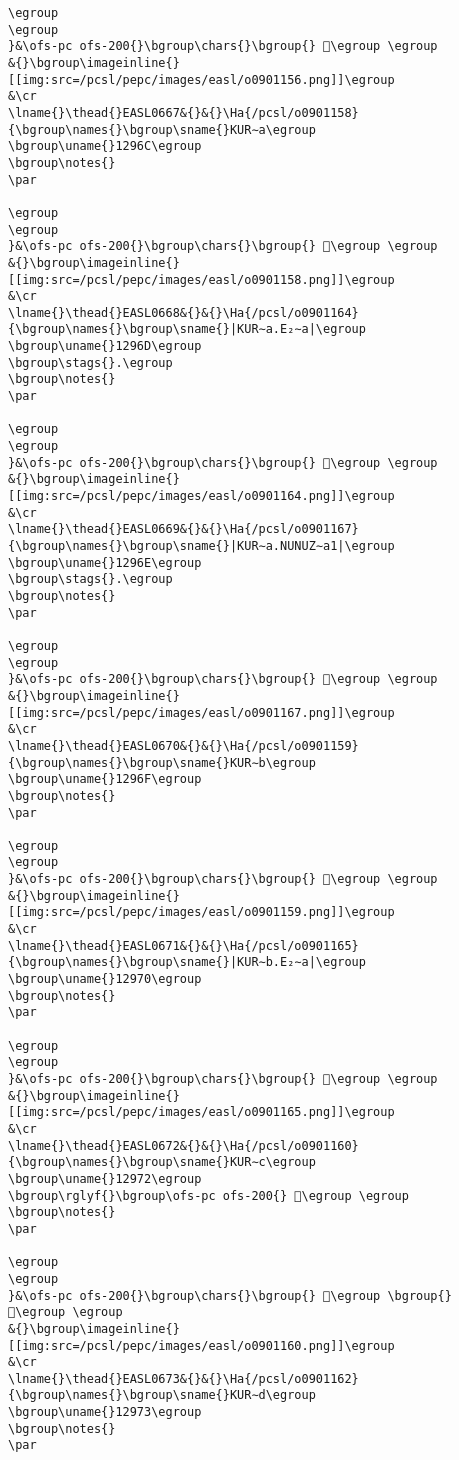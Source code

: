 \begin{verbatim}
\egroup
\egroup
}&\ofs-pc ofs-200{}\bgroup\chars{}\bgroup{} 󲣌\egroup \egroup
&{}\bgroup\imageinline{}[[img:src=/pcsl/pepc/images/easl/o0901156.png]]\egroup
&\cr
\lname{}\thead{}EASL0667&{}&{}\Ha{/pcsl/o0901158}{\bgroup\names{}\bgroup\sname{}KUR∼a\egroup
\bgroup\uname{}1296C\egroup
\bgroup\notes{}
\par 

\egroup
\egroup
}&\ofs-pc ofs-200{}\bgroup\chars{}\bgroup{} 𒥬\egroup \egroup
&{}\bgroup\imageinline{}[[img:src=/pcsl/pepc/images/easl/o0901158.png]]\egroup
&\cr
\lname{}\thead{}EASL0668&{}&{}\Ha{/pcsl/o0901164}{\bgroup\names{}\bgroup\sname{}|KUR∼a.E₂∼a|\egroup
\bgroup\uname{}1296D\egroup
\bgroup\stags{}.\egroup
\bgroup\notes{}
\par 

\egroup
\egroup
}&\ofs-pc ofs-200{}\bgroup\chars{}\bgroup{} 𒥭\egroup \egroup
&{}\bgroup\imageinline{}[[img:src=/pcsl/pepc/images/easl/o0901164.png]]\egroup
&\cr
\lname{}\thead{}EASL0669&{}&{}\Ha{/pcsl/o0901167}{\bgroup\names{}\bgroup\sname{}|KUR∼a.NUNUZ∼a1|\egroup
\bgroup\uname{}1296E\egroup
\bgroup\stags{}.\egroup
\bgroup\notes{}
\par 

\egroup
\egroup
}&\ofs-pc ofs-200{}\bgroup\chars{}\bgroup{} 𒥮\egroup \egroup
&{}\bgroup\imageinline{}[[img:src=/pcsl/pepc/images/easl/o0901167.png]]\egroup
&\cr
\lname{}\thead{}EASL0670&{}&{}\Ha{/pcsl/o0901159}{\bgroup\names{}\bgroup\sname{}KUR∼b\egroup
\bgroup\uname{}1296F\egroup
\bgroup\notes{}
\par 

\egroup
\egroup
}&\ofs-pc ofs-200{}\bgroup\chars{}\bgroup{} 𒥯\egroup \egroup
&{}\bgroup\imageinline{}[[img:src=/pcsl/pepc/images/easl/o0901159.png]]\egroup
&\cr
\lname{}\thead{}EASL0671&{}&{}\Ha{/pcsl/o0901165}{\bgroup\names{}\bgroup\sname{}|KUR∼b.E₂∼a|\egroup
\bgroup\uname{}12970\egroup
\bgroup\notes{}
\par 

\egroup
\egroup
}&\ofs-pc ofs-200{}\bgroup\chars{}\bgroup{} 𒥰\egroup \egroup
&{}\bgroup\imageinline{}[[img:src=/pcsl/pepc/images/easl/o0901165.png]]\egroup
&\cr
\lname{}\thead{}EASL0672&{}&{}\Ha{/pcsl/o0901160}{\bgroup\names{}\bgroup\sname{}KUR∼c\egroup
\bgroup\uname{}12972\egroup
\bgroup\rglyf{}\bgroup\ofs-pc ofs-200{} 𒥲\egroup \egroup
\bgroup\notes{}
\par 

\egroup
\egroup
}&\ofs-pc ofs-200{}\bgroup\chars{}\bgroup{} 𒥱\egroup \bgroup{} 𒥲\egroup \egroup
&{}\bgroup\imageinline{}[[img:src=/pcsl/pepc/images/easl/o0901160.png]]\egroup
&\cr
\lname{}\thead{}EASL0673&{}&{}\Ha{/pcsl/o0901162}{\bgroup\names{}\bgroup\sname{}KUR∼d\egroup
\bgroup\uname{}12973\egroup
\bgroup\notes{}
\par 


\end{verbatim}
